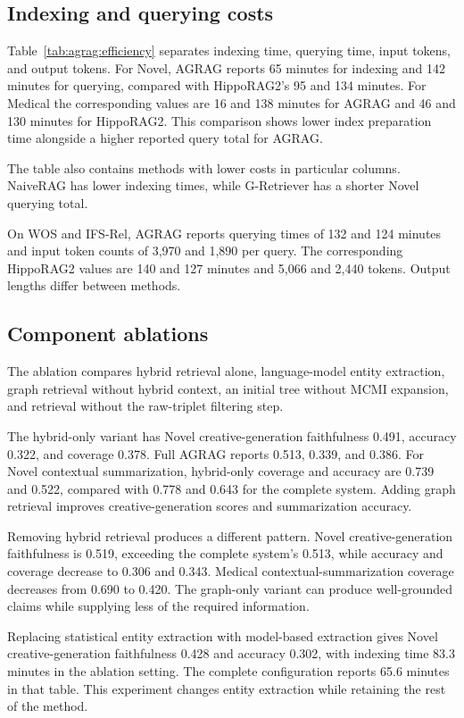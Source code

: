 \subsection{Indexing and querying costs}

Table~\ref{tab:agrag:efficiency} separates indexing time, querying time, input tokens, and output tokens. For Novel, AGRAG reports 65 minutes for indexing and 142 minutes for querying, compared with HippoRAG2's 95 and 134 minutes. For Medical the corresponding values are 16 and 138 minutes for AGRAG and 46 and 130 minutes for HippoRAG2. This comparison shows lower index preparation time alongside a higher reported query total for AGRAG.

The table also contains methods with lower costs in particular columns. NaiveRAG has lower indexing times, while G-Retriever has a shorter Novel querying total.

On WOS and IFS-Rel, AGRAG reports querying times of 132 and 124 minutes and input token counts of 3,970 and 1,890 per query. The corresponding HippoRAG2 values are 140 and 127 minutes and 5,066 and 2,440 tokens. Output lengths differ between methods.

\subsection{Component ablations}

The ablation compares hybrid retrieval alone, language-model entity extraction, graph retrieval without hybrid context, an initial tree without MCMI expansion, and retrieval without the raw-triplet filtering step.

The hybrid-only variant has Novel creative-generation faithfulness 0.491, accuracy 0.322, and coverage 0.378. Full AGRAG reports 0.513, 0.339, and 0.386. For Novel contextual summarization, hybrid-only coverage and accuracy are 0.739 and 0.522, compared with 0.778 and 0.643 for the complete system. Adding graph retrieval improves creative-generation scores and summarization accuracy.

Removing hybrid retrieval produces a different pattern. Novel creative-generation faithfulness is 0.519, exceeding the complete system's 0.513, while accuracy and coverage decrease to 0.306 and 0.343. Medical contextual-summarization coverage decreases from 0.690 to 0.420. The graph-only variant can produce well-grounded claims while supplying less of the required information.

Replacing statistical entity extraction with model-based extraction gives Novel creative-generation faithfulness 0.428 and accuracy 0.302, with indexing time 83.3 minutes in the ablation setting. The complete configuration reports 65.6 minutes in that table. This experiment changes entity extraction while retaining the rest of the method.

